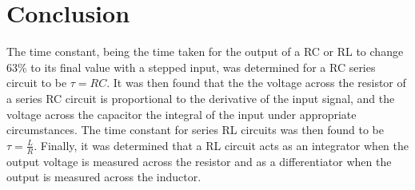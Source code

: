 \documentclass[12pt]{article}
\begin{document}
\section{Conclusion}
The time constant, being the time taken for the output of a RC or RL to change 63\% to its final value with a stepped input, was determined for a RC series circuit to be $\tau=RC$. It was then found that the the voltage across the resistor of a series RC circuit is proportional to the derivative  of the input signal, and the voltage across the capacitor the integral of the input under appropriate circumstances. The time constant for series RL circuits was then found to be $\tau= \frac{L}{R}$. Finally, it was determined that a RL circuit acts as an integrator when the output voltage is measured across the resistor and as a differentiator when the output is measured across the inductor.
\end{document}
